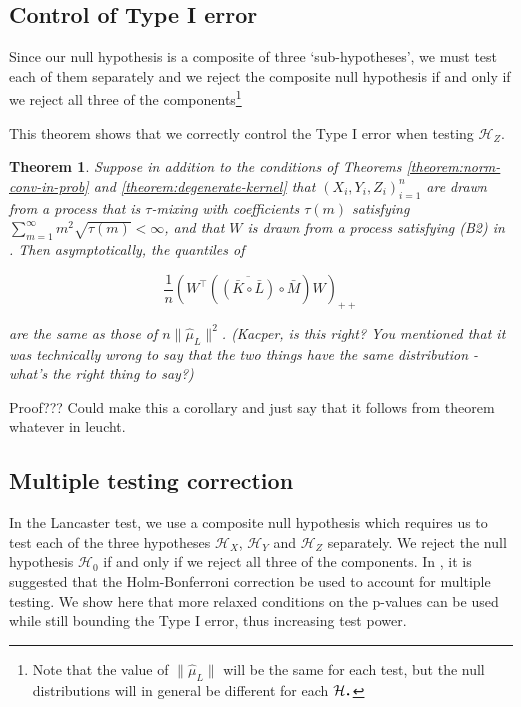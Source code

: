 \documentclass[]{article}
\newtheorem{theorem}{Theorem}
\newcommand*{\LargerCdot}{\raisebox{-0.25ex}{\scalebox{1.5}{$\cdot$}}}
\begin{document}
\subsection{Control of Type I error}
Since our null hypothesis is a composite of three `sub-hypotheses', we must test each of them separately and we reject the composite null hypothesis if and only if we reject all three of the components\footnote{Note that the value of $\|\hat \mu_L\|$ will be the same for each test, but the null distributions will in general be different for each $\mathcal{H}_{\LargerCdot}$}

This theorem shows that we correctly control the Type I error when testing $\mathcal{H}_Z$.

\begin{theorem}
Suppose in addition to the conditions of Theorems \ref{theorem:norm-conv-in-prob} and \ref{theorem:degenerate-kernel} that  $(X_i,Y_i,Z_i)_{i=1}^n$ are drawn from a process that is $\tau$-mixing with coefficients $\tau(m)$ satisfying $\sum_{m=1}^\infty m^2 \sqrt{\tau(m)} < \infty$, and that $W$ is drawn from a process satisfying (B2) in \cite{leucht2013dependent}. Then asymptotically, the quantiles of

\[\frac{1}{n}\left(W^\intercal\left( \overline{\left( \bar{K} \circ \bar{L}\right) }\circ \bar{M} \right)W\right) _{++}\]

are the same as those of $ n\| \hat \mu_L\|^2$. (Kacper, is this right? You mentioned that it was technically wrong to say that the two things have the same distribution - what's the right thing to say?)
\end{theorem}

Proof??? Could make this a corollary and just say that it follows from theorem whatever in leucht.


\subsection{Multiple testing correction}
In the Lancaster test, we use a composite null hypothesis which requires us to test each of the three hypotheses $\mathcal{H}_X$, $\mathcal{H}_Y$ and $\mathcal{H}_Z$ separately. We reject the null hypothesis $\mathcal{H}_0$ if and only if we reject all three of the components. In \cite{sejdinovic2013kernel}, it is suggested that the Holm-Bonferroni \cite{holm1979simple} correction be used to account for multiple testing. We show here that more relaxed conditions on the p-values can be used while still bounding the Type I error, thus increasing test power.
\end{document}
